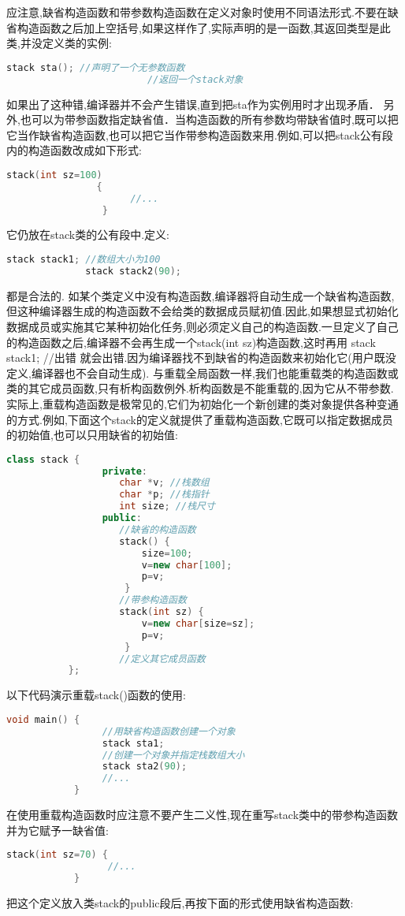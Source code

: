 \documentclass{article}
\begin{document}
应注意,缺省构造函数和带参数构造函数在定义对象时使用不同语法形式.不要在缺省构造函数之后加上空括号,如果这样作了,实际声明的是一函数,其返回类型是此类,并没定义类的实例:
\begin{lstlisting}[language=c++]
            stack sta(); //声明了一个无参数函数
                         //返回一个stack对象
\end{lstlisting}
如果出了这种错,编译器并不会产生错误,直到把sta作为实例用时才出现矛盾．
另外,也可以为带参函数指定缺省值．当构造函数的所有参数均带缺省值时,既可以把它当作缺省构造函数,也可以把它当作带参构造函数来用.例如,可以把stack公有段内的构造函数改成如下形式:
\begin{lstlisting}[language=c++]
                stack(int sz=100)
                {
                      //...
                 }
\end{lstlisting}
它仍放在stack类的公有段中.定义:
\begin{lstlisting}[language=c++]
              stack stack1; //数组大小为100
              stack stack2(90);
\end{lstlisting}
都是合法的.
    如某个类定义中没有构造函数,编译器将自动生成一个缺省构造函数,但这种编译器生成的构造函数不会给类的数据成员赋初值.因此,如果想显式初始化数据成员或实施其它某种初始化任务,则必须定义自己的构造函数.一旦定义了自己的构造函数之后,编译器不会再生成一个stack(int sz)构造函数,这时再用
          stack stack1; //出错
就会出错.因为编译器找不到缺省的构造函数来初始化它(用户既没定义,编译器也不会自动生成).
    与重载全局函数一样,我们也能重载类的构造函数或类的其它成员函数,只有析构函数例外.析构函数是不能重载的,因为它从不带参数.实际上,重载构造函数是极常见的,它们为初始化一个新创建的类对象提供各种变通的方式.例如,下面这个stack的定义就提供了重载构造函数,它既可以指定数据成员的初始值,也可以只用缺省的初始值:
\begin{lstlisting}[language=c++]
           class stack {           
                 private:
                    char *v; //栈数组
                    char *p; //栈指针
                    int size; //栈尺寸
                 public:
                    //缺省的构造函数
                    stack() {                    
                        size=100;
                        v=new char[100];
                        p=v;
                     }
                    //带参构造函数
                    stack(int sz) {                    
                        v=new char[size=sz];
                        p=v;
                     }
                    //定义其它成员函数
           };
\end{lstlisting}
以下代码演示重载stack()函数的使用:
\begin{lstlisting}[language=c++]
           void main() {           
                 //用缺省构造函数创建一个对象
                 stack sta1;
                 //创建一个对象并指定栈数组大小
                 stack sta2(90);
                 //...
            }
\end{lstlisting}
在使用重载构造函数时应注意不要产生二义性,现在重写stack类中的带参构造函数并为它赋予一缺省值:
\begin{lstlisting}[language=c++]
           stack(int sz=70) {           
                  //...
            }
\end{lstlisting}
把这个定义放入类stack的public段后,再按下面的形式使用缺省构造函数:
\end{document}
